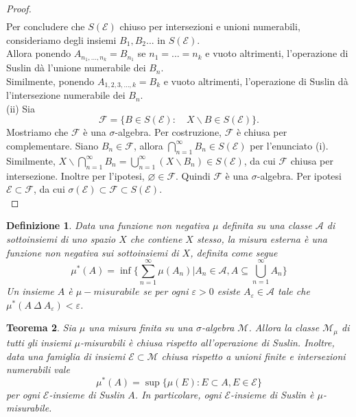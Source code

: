 \documentclass[a4paper, twoside,openright]{article}
\newcommand{\<}{\langle}
\renewcommand{\>}{\rangle}
\newtheorem{teo}{Teorema}[]
\newtheorem{defin}[teo]{Definizione}
\begin{document}
\begin{proof}
$$\begin{aligned}
	\end{aligned}
	$$
	Per concludere che $S(\mathcal{E})$ chiuso per intersezioni e unioni numerabili, consideriamo degli insiemi $B_1, B_2...$ in $S(\mathcal{E})$.\\
	Allora ponendo $A_{n_1,...,n_k}=B_{n_1}$ se $n_1=...=n_k$ e vuoto altrimenti, l'operazione di Suslin dà l'unione numerabile dei $B_n$.\\
	Similmente, ponendo $A_{1,2,3,...,k}=B_{k}$ e vuoto altrimenti,  l'operazione di Suslin dà l'intersezione numerabile dei $B_n$.\\
	(ii) Sia
	$$
	\mathcal{F}=\{B \in S(\mathcal{E}): \quad X \backslash B \in S(\mathcal{E})\} .
	$$
	Mostriamo che $\mathcal{F}$ è una $\sigma$-algebra. Per costruzione, $\mathcal{F}$ è chiusa per complementare. Siano $B_{n} \in \mathcal{F}$, allora $\bigcap_{n=1}^{\infty} B_{n} \in S(\mathcal{E})$ per l'enunciato (i). Similmente, $X \backslash \bigcap_{n=1}^{\infty} B_{n}=\bigcup_{n=1}^{\infty}\left(X \backslash B_{n}\right) \in S(\mathcal{E})$, da cui $\mathcal{F}$ chiusa per intersezione. Inoltre per l'ipotesi, $\varnothing \in \mathcal{F}$. Quindi $\mathcal{F}$ è una $\sigma$-algebra. Per ipotesi $\mathcal{E} \subset \mathcal{F}$, da cui $\sigma(\mathcal{E}) \subset \mathcal{F} \subset S(\mathcal{E})$.\\
\end{proof}

\begin{defin}
	Data una funzione non negativa $\mu$ definita su una classe $\mathcal{A}$ di sottoinsiemi di uno spazio $X$ che contiene $X$ stesso, la misura esterna è una funzione non negativa sui sottoinsiemi di $X$, definita come segue
	$$ \mu^*(A) = \inf \{ \sum_{n=1}^{\infty} \mu (A_n) | A_n \in \mathcal{A}, A \subseteq \bigcup_{n=1}^{\infty} A_n \} $$
	Un insieme $A$ è $\mu-misurabile$ se per ogni $\varepsilon > 0$ esiste $A_{\varepsilon} \in \mathcal{A}$ tale che $\mu^*(A \ \Delta \ A_{\varepsilon}) < \varepsilon$.
\end{defin}	


\begin{teo} \label{misurab}
	Sia $\mu$ una misura finita su una $\sigma$-algebra $\mathcal{M}$. Allora la classe $\mathcal{M}_{\mu}$ di tutti gli insiemi $\mu$-misurabili è chiusa rispetto all'operazione di Suslin. Inoltre, data una famiglia di insiemi $\mathcal{E} \subset \mathcal{M}$ chiusa rispetto a unioni finite e intersezioni numerabili vale
	$$
	\mu^{*}(A)=\sup \{\mu(E): E \subset A, E \in \mathcal{E}\}
	$$
	per ogni $\mathcal{E}$-insieme di Suslin $A$. In particolare, ogni $\mathcal{E}$-insieme di Suslin è $\mu$-misurabile.
\end{teo}
\end{document}
